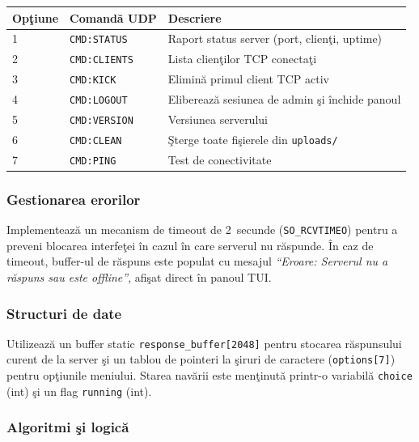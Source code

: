 \documentclass[12pt, a4paper]{article}
\begin{document}
\begin{center}
\begin{tabular}{lll}
\toprule
\textbf{Op\c{t}iune} & \textbf{Comand\u{a} UDP} & \textbf{Descriere} \\
\midrule
1 & \texttt{CMD:STATUS}  & Raport status server (port, clien\c{t}i, uptime) \\
2 & \texttt{CMD:CLIENTS} & Lista clien\c{t}ilor TCP conecta\c{t}i \\
3 & \texttt{CMD:KICK}    & Elimin\u{a} primul client TCP activ \\
4 & \texttt{CMD:LOGOUT}  & Elibereaz\u{a} sesiunea de admin \c{s}i \^{i}nchide panoul \\
5 & \texttt{CMD:VERSION} & Versiunea serverului \\
6 & \texttt{CMD:CLEAN}   & \c{S}terge toate fi\c{s}ierele din \texttt{uploads/} \\
7 & \texttt{CMD:PING}    & Test de conectivitate \\
\bottomrule
\end{tabular}
\end{center}

\subsubsection{Gestionarea erorilor}

Implementeaz\u{a} un mecanism de timeout de 2~secunde (\texttt{SO\_RCVTIMEO}) pentru a preveni
blocarea interfe\c{t}ei \^{i}n cazul \^{i}n care serverul nu r\u{a}spunde. \^{I}n caz de timeout,
buffer-ul de r\u{a}spuns este populat cu mesajul \textit{``Eroare: Serverul nu a r\u{a}spuns sau
este offline''}, afi\c{s}at direct \^{i}n panoul TUI.

\subsubsection{Structuri de date}

Utilizeaz\u{a} un buffer static \texttt{response\_buffer[2048]} pentru stocarea r\u{a}spunsului
curent de la server \c{s}i un tablou de pointeri la \c{s}iruri de caractere (\texttt{options[7]})
pentru op\c{t}iunile meniului. Starea nav\u{a}rii este men\c{t}inut\u{a} printr-o variabil\u{a}
\texttt{choice} (int) \c{s}i un flag \texttt{running} (int).

\subsubsection{Algoritmi \c{s}i logic\u{a}}
\end{document}
